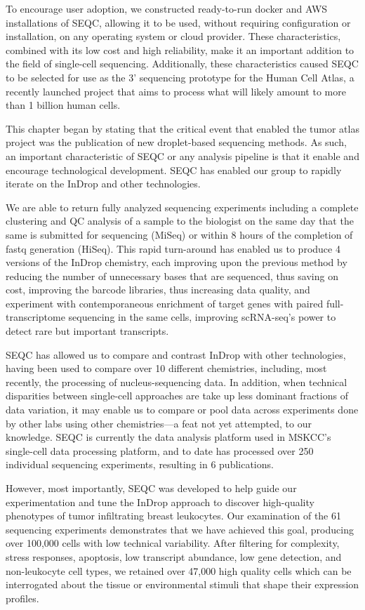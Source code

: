 To encourage user adoption, we constructed ready-to-run docker and AWS installations of SEQC, allowing it to be used, without requiring configuration or installation, on any operating system or cloud provider. 
These characteristics, combined with its low cost and high reliability, make it an important addition to the field of single-cell sequencing. 
Additionally, these characteristics caused SEQC to be selected for use as the 3' sequencing prototype for the Human Cell Atlas, a recently launched project that aims to process what will likely amount to more than 1 billion human cells.   

This chapter began by stating that the critical event that enabled the tumor atlas project was the publication of new droplet-based sequencing methods. 
As such, an important characteristic of SEQC or any analysis pipeline is that it enable and encourage technological development. 
SEQC has enabled our group to rapidly iterate on the InDrop and other technologies. 

We are able to return fully analyzed sequencing experiments including a complete clustering and QC analysis of a sample to the biologist on the same day that the same is submitted for sequencing (MiSeq) or within 8 hours of the completion of fastq generation (HiSeq). 
This rapid turn-around has enabled us to produce 4 versions of the InDrop chemistry, each improving upon the previous method by reducing the number of unnecessary bases that are sequenced, thus saving on cost, improving the barcode libraries, thus increasing data quality, and experiment with contemporaneous enrichment of target genes with paired full-transcriptome sequencing in the same cells, improving scRNA-seq's power to detect rare but important transcripts. 

SEQC has allowed us to compare and contrast InDrop with other technologies, having been used to compare over 10 different chemistries, including, most recently, the processing of nucleus-sequencing data. 
In addition, when technical disparities between single-cell approaches are take up less dominant fractions of data variation, it may enable us to compare or pool data across experiments done by other labs using other chemistries---a feat not yet attempted, to our knowledge.
SEQC is currently the data analysis platform used in MSKCC's single-cell data processing platform, and to date has processed over 250 individual sequencing experiments, resulting in 6 publications. 

However, most importantly, SEQC was developed to help guide our experimentation and tune the InDrop approach to discover high-quality phenotypes of tumor infiltrating breast leukocytes. 
Our examination of the 61 sequencing experiments demonstrates that we have achieved this goal, producing over 100,000 cells with low technical variability.
After filtering for complexity, stress responses, apoptosis, low transcript abundance, low gene detection, and non-leukocyte cell types, we retained over 47,000 high quality cells which can be interrogated about the tissue or environmental stimuli that shape their expression profiles.
